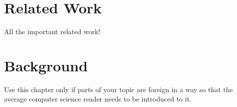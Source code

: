 \setchaptertoc
\chapter{Related Work}\label{chp:related-work}
\begin{summary}
   All the important related work!
\end{summary}

\chapter{Background}\label{chp:background}

\begin{summary}
Use this chapter only if parts of your topic are foreign in a way so that the average computer science reader needs to be introduced to it. 
\end{summary}

